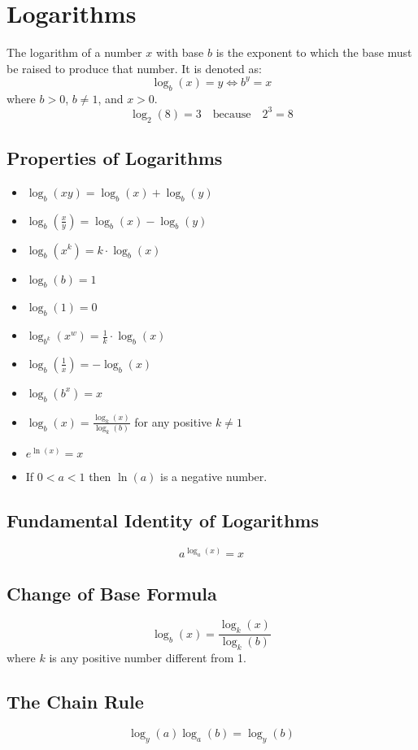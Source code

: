 \section{Logarithms}

The logarithm of a number $x$ with base $b$ is the exponent to which the base must be raised to produce that number. It is denoted as:
  \[
    \log_b(x) = y \iff b^y = x
  \]
where $b > 0$, $b \neq 1$, and $x > 0$.
  \[
    \log_2(8) = 3 \quad \text{because} \quad 2^3 = 8
  \]


\subsection{Properties of Logarithms}
\begin{itemize}[label=$-$]
  \item $\log_b(xy) = \log_b(x) + \log_b(y)$
  \item $\log_b\left(\frac{x}{y}\right) = \log_b(x) - \log_b(y)$
  \item $\log_b(x^k) = k \cdot \log_b(x)$
  \item $\log_b(b) = 1$
  \item $\log_b(1) = 0$
  \item $\log_{b^k}(x^w) = \frac{1}{k} \cdot \log_b(x)$
  \item $\log_b\left(\frac{1}{x}\right) = -\log_b(x)$
  \item $\log_b(b^x) = x$
  \item $\log_b(x) = \frac{\log_k(x)}{\log_k(b)}$ for any positive $k \neq 1$
  \item $e^{\ln(x)} = x$
  \item If $0 < a < 1$ then $\ln(a)$ is a negative number. 
\end{itemize}

\subsection{Fundamental Identity of Logarithms}
\[
a^{\log_a(x)} = x
\]

\subsection{Change of Base Formula}
\[
\log_b(x) = \frac{\log_k(x)}{\log_k(b)}
\]
where $k$ is any positive number different from 1.

\subsection{The Chain Rule}
\[
    \log_y(a) \log_a(b) = \log_y(b)
\]

